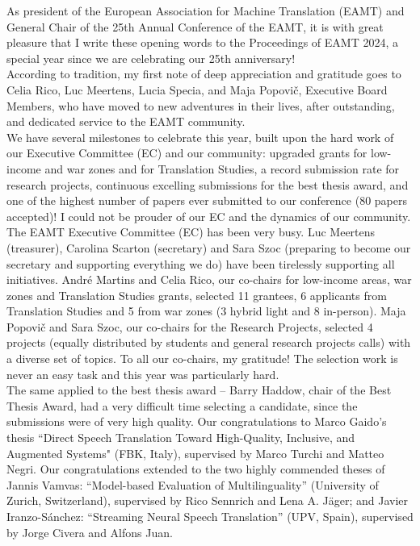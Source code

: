 As president of the European Association for Machine Translation (EAMT) and General Chair of the 25th Annual Conference of the EAMT, it is with great pleasure that I write these opening words to the Proceedings of EAMT 2024, a special year since we are celebrating our 25th anniversary!
\\

According to tradition, my first note of deep appreciation and gratitude goes to Celia Rico, Luc Meertens, Lucia Specia, and Maja Popovič, Executive Board Members, who have moved to new adventures in their lives, after outstanding, and dedicated service to the EAMT community.
\\

We have several milestones to celebrate this year, built upon the hard work of our Executive Committee (EC) and our community: upgraded grants for low-income and war zones and for Translation Studies, a record submission rate for research projects, continuous excelling submissions for the best thesis award, and one of the highest number of papers ever submitted to our conference (80 papers accepted)! I could not be prouder of our EC and the dynamics of our community.
\\

The EAMT Executive Committee (EC) has been very busy. Luc Meertens (treasurer), Carolina Scarton (secretary) and Sara Szoc (preparing to become our secretary and supporting everything we do) have been tirelessly supporting all initiatives. André Martins and Celia Rico, our co-chairs for low-income areas, war zones and Translation Studies grants, selected 11 grantees, 6 applicants from Translation Studies and 5 from war zones (3 hybrid light and 8 in-person). Maja Popovič and Sara Szoc, our co-chairs for the Research Projects, selected 4  projects (equally distributed by students and general research projects calls) with a diverse set of topics. To all our co-chairs, my gratitude! The selection work is never an easy task and this year was particularly hard. 
\\

The same applied to the best thesis award –  Barry Haddow, chair of the Best Thesis Award, had a very difficult time selecting a candidate, since the submissions were of very high quality. Our congratulations to Marco Gaido's thesis “Direct Speech Translation Toward High-Quality, Inclusive, and Augmented Systems" (FBK, Italy), supervised by Marco Turchi and Matteo Negri. Our congratulations extended to the two highly commended theses of Jannis Vamvas: “Model-based Evaluation of Multilinguality” (University of Zurich, Switzerland), supervised by Rico Sennrich and Lena A. Jäger; and Javier Iranzo-Sánchez: “Streaming Neural Speech Translation” (UPV, Spain), supervised by Jorge Civera and Alfons Juan. 
\\

